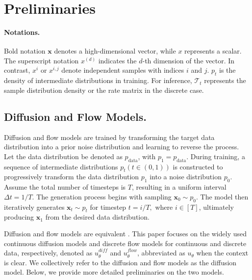 \vspace{-10pt}
\section{Preliminaries}
\paragraph{Notations.} Bold notation \( \boldsymbol{x} \) denotes a high-dimensional vector, while \( x \) represents a scalar. The superscript notation \( x^{(d)} \) indicates the \( d \)-th dimension of the vector. In contrast, \( x^i \) or \( x^{i,j} \) denote independent samples with indices \( i \) and \( j \). $p_t$ is the density of intermediate distributions in training. For inference, $\mathcal{T}_t$ represents the sample distribution density or the rate matrix in the discrete case.

\subsection{Diffusion and Flow Models.} Diffusion and flow models are trained by transforming the target data distribution into a prior noise distribution and learning to reverse the process. Let the data distribution be denoted as $p_{\text{data}}$, with $p_1 = p_{\text{data}}$. During training, a sequence of intermediate distributions $p_t (t \in (0,1))$ is constructed to progressively transform the data distribution $p_1$ into a noise distribution $p_0$. Assume the total number of timesteps is $T$, resulting in a uniform interval $\Delta t = 1/T$. The generation process begins with sampling $\boldsymbol{x}_0 \sim p_0$. The model then iteratively generates $\boldsymbol{x}_t \sim p_t$ for timestep $t = i/T,$ where $ i\in [T]$,  ultimately producing $\boldsymbol{x}_1$ from the desired data distribution. 




Diffusion and flow models are equivalent \citep{lipman2024flow, domingo2024adjoint}. This paper focuses on the widely used continuous diffusion models and discrete flow models for continuous and discrete data, respectively, denoted as $u_\theta^{\textit{diff}}$ and $u_\theta^{\textit{flow}}$, abbreviated as $u_\theta$ when the context is clear. We collectively refer to the diffusion and flow models as the diffusion model. Below, we provide more detailed preliminaries on the two models.




